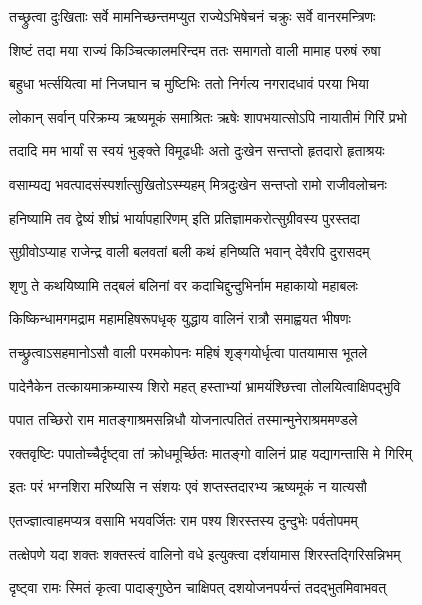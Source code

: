 \twolineshloka
{तच्छ्रुत्वा दुःखिताः सर्वे मामनिच्छन्तमप्युत}
{राज्येऽभिषेचनं चक्रुः सर्वे वानरमन्त्रिणः} %

\twolineshloka
{शिष्टं तदा मया राज्यं किञ्चित्कालमरिन्दम}
{ततः समागतो वाली मामाह परुषं रुषा} %

\twolineshloka
{बहुधा भर्त्सयित्वा मां निजघान च मुष्टिभिः}
{ततो निर्गत्य नगरादधावं परया भिया} %

\twolineshloka
{लोकान् सर्वान् परिक्रम्य ऋष्यमूकं समाश्रितः}
{ऋषेः शापभयात्सोऽपि नायातीमं गिरिं प्रभो} %

\twolineshloka
{तदादि मम भार्यां स स्वयं भुङ्क्ते विमूढधीः}
{अतो दुःखेन सन्तप्तो हृतदारो हृताश्रयः} %

\twolineshloka
{वसाम्यद्य भवत्पादसंस्पर्शात्सुखितोऽस्म्यहम्}
{मित्रदुःखेन सन्तप्तो रामो राजीवलोचनः} %

\twolineshloka
{हनिष्यामि तव द्वेष्यं शीघ्रं भार्यापहारिणम्}
{इति प्रतिज्ञामकरोत्सुग्रीवस्य पुरस्तदा} %

\twolineshloka
{सुग्रीवोऽप्याह राजेन्द्र वाली बलवतां बली}
{कथं हनिष्यति भवान् देवैरपि दुरासदम्} %

\twolineshloka
{शृणु ते कथयिष्यामि तद्बलं बलिनां वर}
{कदाचिद्दुन्दुभिर्नाम महाकायो महाबलः} %

\twolineshloka
{किष्किन्धामगमद्राम महामहिषरूपधृक्}
{युद्धाय वालिनं रात्रौ समाह्वयत भीषणः} %

\twolineshloka
{तच्छ्रुत्वाऽसहमानोऽसौ वाली परमकोपनः}
{महिषं शृङ्गयोर्धृत्वा पातयामास भूतले} %

\twolineshloka
{पादेनैकेन तत्कायमाक्रम्यास्य शिरो महत्}
{हस्ताभ्यां भ्रामयंश्छित्त्वा तोलयित्वाक्षिपद्भुवि} %

\twolineshloka
{पपात तच्छिरो राम मातङ्गाश्रमसन्निधौ}
{योजनात्पतितं तस्मान्मुनेराश्रममण्डले} %

\twolineshloka
{रक्तवृष्टिः पपातोच्चैर्दृष्ट्वा तां क्रोधमूर्च्छितः}
{मातङ्गो वालिनं प्राह यद्यागन्तासि मे गिरिम्} %

\twolineshloka
{इतः परं भग्नशिरा मरिष्यसि न संशयः}
{एवं शप्तस्तदारभ्य ऋष्यमूकं न यात्यसौ} %

\twolineshloka
{एतज्ज्ञात्वाहमप्यत्र वसामि भयवर्जितः}
{राम पश्य शिरस्तस्य दुन्दुभेः पर्वतोपमम्} %

\twolineshloka
{तत्क्षेपणे यदा शक्तः शक्तस्त्वं वालिनो वधे}
{इत्युक्त्वा दर्शयामास शिरस्तद्गिरिसन्निभम्} %

\twolineshloka
{दृष्ट्वा रामः स्मितं कृत्वा पादाङ्गुष्ठेन चाक्षिपत्}
{दशयोजनपर्यन्तं तदद्भुतमिवाभवत्} %

